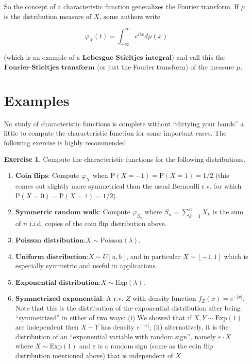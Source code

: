 \documentclass[11pt]{report}
\theoremstyle{plain}
\theoremstyle{definition}
\newtheorem{xexercise}[thm]{Exercise}
\begin{document}
So the concept of a characteristic function
generalizes the Fourier transform. If $\mu$ is the
distribution measure of $X$, some authors write

\[
\varphi_X(t) = \int_{-\infty}^\infty e^{itx} d\mu(x)
\]

\noindent (which is an example of a
$\textbf{Lebesgue-Stieltjes integral}$) and call this
the $\textbf{Fourier-Stieltjes transform}$ (or just
the Fourier transform) of the measure $\mu$.

\section{Examples}

No study of characteristic functions is complete
without ``dirtying your hands'' a little to compute
the characteristic function for some important cases.
The following exercise is highly recommended

\begin{xexercise}
Compute the characteristic functions for the
following distributions.

\begin{enumerate}[label=\arabic*.]
\item $\textbf{Coin flips:}$ Compute $\varphi_X$ when
$\mathrm{P}(X=-1)=\mathrm{P}(X=1)=1/2$ (this comes
out slightly more symmetrical than the usual Bernoulli
r.v. for which $\mathrm{P}(X=0)=\mathrm{P}(X=1)=1/2$).

\item $\textbf{Symmetric random walk:}$ Compute
$\varphi_{S_n}$ where $S_n=\sum_{k=1}^n X_k$ is the
sum of $n$ i.i.d. copies of the coin flip
distribution above.

\item $\textbf{Poisson distribution:}$$X\sim \textrm{Poisson}(\lambda)$.

\item $\textbf{Uniform distribution:}$$X \sim U[a,b]$, and
in particular $X\sim [-1,1]$ which is especially
symmetric and useful in applications.

\item $\textbf{Exponential distribution:}$$X\sim \textrm{Exp}(\lambda)$.

\item $\textbf{Symmetrized exponential:}$ A r.v. $Z$ with
density function $f_Z(x) = e^{-|x|}$. Note that this
is the distribution of the exponential distribution
after being ``symmetrized'' in either of two ways: (i)
We showed that if $X,Y\sim \textrm{Exp}(1)$ are
independent then $X-Y$ has density $e^{-|x|}$; (ii)
alternatively, it is the distribution of an
``exponential variable with random sign'', namely
$\varepsilon\cdot X$ where $X\sim \textrm{Exp}(1)$
and $\varepsilon$ is a random sign (same as the coin
flip distribution mentioned above) that is independent
of $X$.
\end{enumerate}

\end{xexercise}
\end{document}
